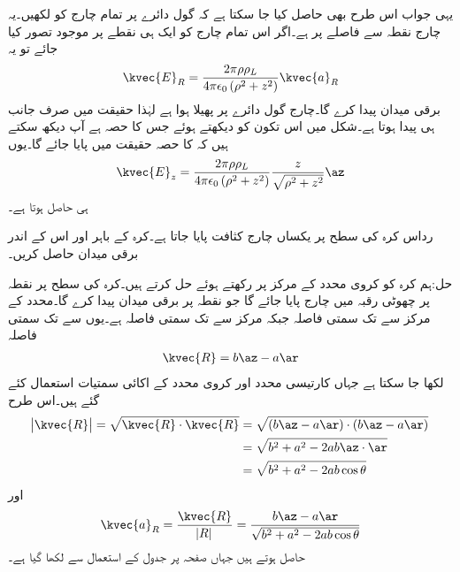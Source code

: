 یہی جواب اس طرح بھی حاصل کیا جا سکتا ہے کہ گول دائرے پر تمام چارج کو  لکھیں۔یہ چارج نقطہ  سے  فاصلے پر ہے۔اگر اس تمام چارج کو ایک ہی نقطے   پر موجود تصور کیا جائے تو یہ
\begin{align*}
\kvec{E}_R=\frac{2\pi\rho\rho_L}{4\pi\epsilon_0 \left(\rho^2+z^2 \right)} \kvec{a}_R
\end{align*}
برقی میدان پیدا کرے گا۔چارج گول دائرے پر پھیلا ہوا ہے لہٰذا حقیقت میں صرف  جانب ہی  پیدا ہوتا ہے۔شکل میں اس تکون کو دیکھتے ہوئے جس کا  حصہ ہے  آپ دیکھ سکتے ہیں کہ  کا  حصہ  حقیقت میں پایا جائے گا۔یوں 
\begin{align*}
\kvec{E}_z=\frac{2\pi\rho\rho_L}{4\pi\epsilon_0 \left(\rho^2+z^2 \right)} \frac{z}{\sqrt{\rho^2+z^2}} \az
\end{align*}
ہی حاصل ہوتا ہے۔

رداس  کرہ کی سطح پر یکساں چارج کثافت  پایا جاتا ہے۔کرہ کے باہر اور اس کے اندر برقی میدان   حاصل کریں۔

حل:ہم کرہ کو کروی محدد کے مرکز پر رکھتے ہوئے حل کرتے ہیں۔کرہ کی سطح پر نقطہ  پر چھوٹی رقبہ  میں چارج  پایا جائے گا جو  نقطہ  پر برقی میدان  پیدا کرے گا۔محدد کے مرکز سے  تک سمتی فاصلہ  جبکہ مرکز سے  تک سمتی فاصلہ  ہے۔یوں  سے  تک سمتی فاصلہ 
\begin{align}
\kvec{R}=b\az-a\ar
\end{align}
لکھا جا سکتا ہے جہاں کارتیسی محدد اور کروی محدد کے اکائی سمتیات استعمال کئے گئے ہیں۔اس طرح
\begin{gather}
\begin{aligned}
\abs{\kvec{R}}=\sqrt{\kvec{R} \cdot \kvec{R}}&= \sqrt{(b\az-a\ar)\cdot (b\az-a\ar)}\\
&=\sqrt{b^2+a^2-2 ab \az \cdot \ar}\\
&=\sqrt{b^2+a^2-2 ab \cos \theta}
\end{aligned}
\end{gather}
اور
\begin{align}
\kvec{a}_R=\frac{\kvec{R}}{\abs{R}}=\frac{b\az-a\ar}{\sqrt{b^2+a^2-2 ab \cos \theta}}
\end{align}
حاصل ہوتے ہیں جہاں صفحہ  پر جدول  کے استعمال سے  لکھا گیا ہے۔

